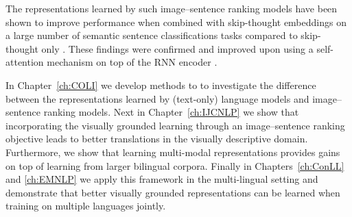 
The representations learned by such image--sentence  ranking models have
been shown
to improve performance when combined with skip-thought embeddings
on a large number of semantic sentence classifications tasks compared to
skip-thought only \citep{kiela2017learning}. These findings were confirmed and improved upon using a
self-attention mechanism on top of the RNN encoder \citep{yoo2017improving}.

In Chapter~\ref{ch:COLI} we develop methods to
to investigate the difference between the representations learned by (text-only) language
models and image--sentence ranking models.
Next in Chapter~\ref{ch:IJCNLP} we show that incorporating
the visually grounded learning through an image--sentence ranking objective
leads to better translations in the visually descriptive domain. Furthermore,
we show that learning multi-modal representations provides gains on top of learning
from larger bilingual corpora.
Finally in Chapters~\ref{ch:ConLL} and \ref{ch:EMNLP} we apply this
framework in the multi-lingual setting and demonstrate
that better visually grounded representations can be learned when training on multiple
languages jointly.





